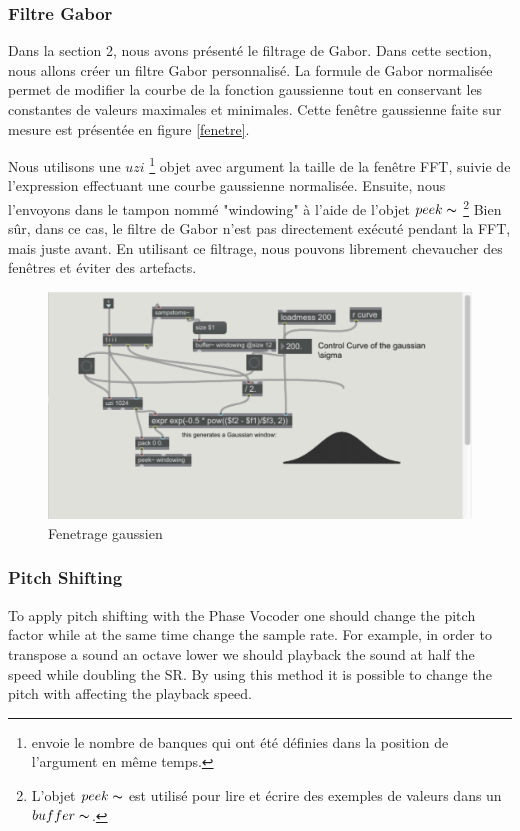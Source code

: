 \subsubsection{Filtre Gabor}

Dans la section 2, nous avons présenté le filtrage de Gabor. Dans cette section, nous allons créer un filtre Gabor personnalisé. La formule de Gabor normalisée permet de modifier la courbe de la fonction gaussienne tout en conservant les constantes de valeurs maximales et minimales. Cette fenêtre gaussienne faite sur mesure est présentée en figure \ref{fenetre}.

Nous utilisons une $ uzi $ \footnote{envoie le nombre de banques qui ont été définies dans la position de l'argument en même temps. } objet avec argument la taille de la fenêtre FFT, suivie de l'expression effectuant une courbe gaussienne normalisée. Ensuite, nous l'envoyons dans le tampon nommé "windowing" à l'aide de l'objet $ peek \thicksim $ \footnote{L'objet $ peek \thicksim $ est utilisé pour lire et écrire des exemples de valeurs dans un $ buffer \thicksim $.} Bien sûr, dans ce cas, le filtre de Gabor n’est pas directement exécuté pendant la FFT, mais juste avant. En utilisant ce filtrage, nous pouvons librement chevaucher des fenêtres et éviter des artefacts.
    
    \begin{figure}
        \centering
        \includegraphics[width = \textwidth]{Graphs/windowing.png}
        \caption{Fenetrage gaussien}
        \label{windowing}
    \end{figure}

\subsubsection{Pitch Shifting}

    To apply pitch shifting with the Phase Vocoder one should change the pitch factor while at the same time change the sample rate. For example, in order to transpose a sound an octave lower we should playback the sound at half the speed while doubling the SR. By using this method it is possible to change the pitch with affecting the playback speed.

